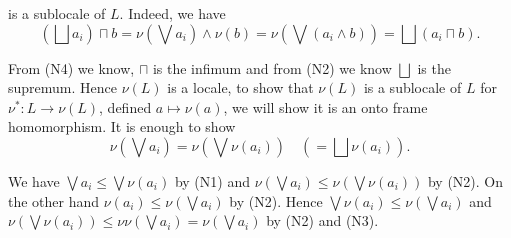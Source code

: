 \noindent is a sublocale of $L$. Indeed, we have
$$ (\bigsqcup a_i)\sqcap b = \nu(\bigvee a_i) \wedge \nu(b) = \nu(\bigvee(a_i \wedge b)) = \bigsqcup (a_i \sqcap b).$$

\noindent From (N4) we know, $\sqcap$ is the infimum and from (N2) we know $\bigsqcup$ is the supremum. Hence $\nu(L)$ is a locale, to show that $\nu(L)$ is a sublocale of $L$ for $\nu^*\colon L \to \nu(L)$, defined $a \mapsto \nu(a)$, we will show it is an onto frame homomorphism. It is enough to show
    $$\nu(\bigvee a_i) = \nu(\bigvee \nu(a_i)) \quad( = \bigsqcup \nu(a_i)).$$

    \noindent We have $\bigvee a_i \leq \bigvee \nu(a_i)$ by (N1) and $\nu(\bigvee a_i) \leq \nu(\bigvee \nu(a_i))$ by (N2). On the other hand $\nu(a_i) \leq \nu(\bigvee a_i)$ by (N2). Hence $\bigvee \nu(a_i) \leq \nu(\bigvee a_i)$ and $\nu(\bigvee \nu(a_i)) \leq \nu\nu(\bigvee a_i) = \nu(\bigvee a_i)$ by (N2) and (N3).
